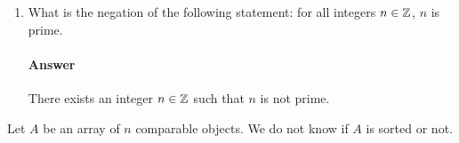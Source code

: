 \documentclass{article}
\begin{document}
\begin{enumerate}
\begin{proof}
	Thus, by the inductive hypothesis and the $k$ edges added to accomodate the additional vertex: 

	$\frac{k(k-1}{2} + k$
	$= \frac{k(k-1}{2} + \frac{2k}{2}$
	$ = \frac{k(k-1) + 2k}{2}$
	$ = \frac{k^2 - k +2k)}{2} $
	$ = \frac{k^2 + k}{2}$
	$ = \frac{k(k+1)}{2}$
	
	The claim that for all $n \in \N$, the complete graph on $n$ vertices has $\frac{n(n-1)}{2}$~edges, which was to be shown.
        \end{proof}

    \item What is the negation of the following statement: for all integers $n
        \in {\mathbb Z}$, $n$ is prime.

        \paragraph{Answer}{There exists an integer $n \in {\mathbb Z}$ such that $n$ is not prime.}

\end{enumerate}


\collab{\todo{}}
Let $A$ be an array of $n$ comparable objects.  We do not know if $A$ is sorted
or not.
\end{document}
